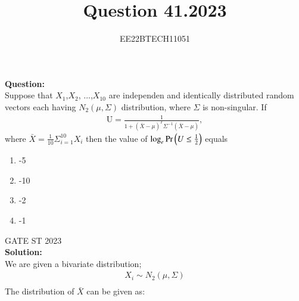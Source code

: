 \documentclass[journal,12pt,onecolumn]{IEEEtran}
\theoremstyle{remark}
\begin{document}

\vspace{3cm}


\title{Question 41.2023}
\author{EE22BTECH11051}

\maketitle
\vspace{3cm}

\textbf{Question:} \\
Suppose that $X_1$,$X_2$, ...,$X_{10}$ are independen and identically distributed random vectors each having
$N_2(\mu,\Sigma)$ distribution, where $\Sigma$ is non-singular. If
\begin{align}
    \text{U} = \frac{1}{1+(\bar{X} - \mu)^T\Sigma^{-1}(\bar{X} - \mu)} ,
\end{align}
where $\bar X = \frac{1}{10}\Sigma_{i = 1}^{10} X_{i}$ then the value of $\log_e \Pr\left(U \le \frac{1}{2}\right)$ equals

\begin{enumerate}
    \item -5
    \item -10
    \item -2
    \item -1
\end{enumerate}
\hfill {GATE ST 2023}\\
\textbf{Solution:}\\
We are given a bivariate distribution;
\begin{align}
    X_{i} \sim N_2(\mu,\Sigma)\\
\end{align}
The distribution of $\bar{X}$ can be given as: \\
\end{document}
